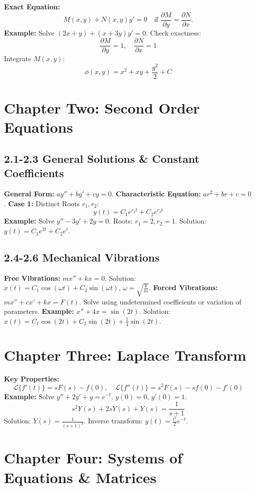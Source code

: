 \documentclass[10pt]{article}
\begin{document}
\begin{multicols}{2}
\textbf{Exact Equation:}  
\[
M(x, y) + N(x, y)y' = 0 \quad \text{if } \frac{\partial M}{\partial y} = \frac{\partial N}{\partial x}.
\]
\textbf{Example:} Solve \( (2x + y) + (x + 3y)y' = 0 \).  
Check exactness:  
\[
\frac{\partial M}{\partial y} = 1, \quad \frac{\partial N}{\partial x} = 1
\]
Integrate \( M(x, y) \):  
\[
\phi(x, y) = x^2 + xy + \frac{y^2}{2} + C
\]

\section*{Chapter Two: Second Order Equations}
\subsection*{2.1-2.3 General Solutions \& Constant Coefficients}
\textbf{General Form:} \( ay'' + by' + cy = 0 \).  
\textbf{Characteristic Equation:} \( ar^2 + br + c = 0 \).  
\textbf{Case 1:} Distinct Roots \( r_1, r_2 \):  
\[
y(t) = C_1e^{r_1t} + C_2e^{r_2t}
\]
\textbf{Example:} Solve \( y'' - 3y' + 2y = 0 \).  
Roots: \( r_1 = 2, r_2 = 1 \).  
Solution: \( y(t) = C_1e^{2t} + C_2e^t \).

\subsection*{2.4-2.6 Mechanical Vibrations}
\textbf{Free Vibrations:} \( mx'' + kx = 0 \).  
Solution: \( x(t) = C_1\cos(\omega t) + C_2\sin(\omega t) \), \( \omega = \sqrt{\frac{k}{m}} \).  
\textbf{Forced Vibrations:} \( mx'' + cx' + kx = F(t) \).  
Solve using undetermined coefficients or variation of parameters.  
\textbf{Example:} \( x'' + 4x = \sin(2t) \).  
Solution: \( x(t) = C_1\cos(2t) + C_2\sin(2t) + \frac{1}{4}\sin(2t) \).

\section*{Chapter Three: Laplace Transform}
\textbf{Key Properties:}
\[
\mathcal{L}\{f'(t)\} = sF(s) - f(0), \quad \mathcal{L}\{f''(t)\} = s^2F(s) - sf(0) - f'(0)
\]
\textbf{Example:} Solve \( y'' + 2y' + y = e^{-t}, \, y(0) = 0, \, y'(0) = 1 \).  
\[
s^2Y(s) + 2sY(s) + Y(s) = \frac{1}{s+1}
\]
Solution: \( Y(s) = \frac{1}{(s+1)^3} \). Inverse transform: \( y(t) = \frac{t^2}{2}e^{-t} \).

\section*{Chapter Four: Systems of Equations \& Matrices}

\end{multicols}
\end{document}
